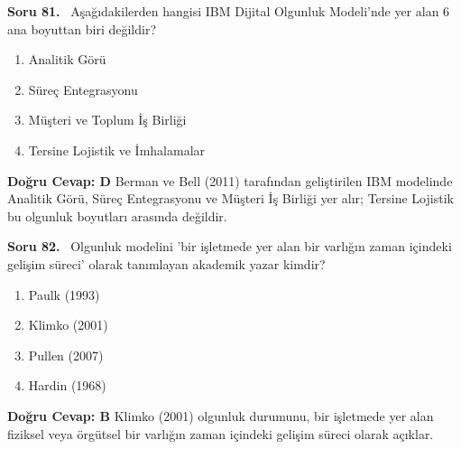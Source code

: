 \documentclass[11pt,a4paper,openany]{book}
\begin{document}
\needspace{5cm}
\vspace{8pt}
\noindent\textbf{\large\sffamily Soru 81.} \ Aşağıdakilerden hangisi IBM Dijital Olgunluk Modeli'nde yer alan 6 ana boyuttan biri değildir?
\begin{enumerate}[label=\Alph*), leftmargin=25pt, topsep=4pt, itemsep=2pt]
    \item Analitik Görü
    \item Süreç Entegrasyonu
    \item Müşteri ve Toplum İş Birliği
    \item Tersine Lojistik ve İmhalamalar
\end{enumerate}
\vspace{4pt}
\begin{tcolorbox}[title=Cevap ve Açıklama, colback=gray!3!white, colframe=primarycolor!90!black, arc=2mm, fonttitle=\bfseries\sffamily, top=6pt, bottom=6pt]
    \textbf{Doğru Cevap: D}
    \vspace{2pt}
    Berman ve Bell (2011) tarafından geliştirilen IBM modelinde Analitik Görü, Süreç Entegrasyonu ve Müşteri İş Birliği yer alır; Tersine Lojistik bu olgunluk boyutları arasında değildir.
\end{tcolorbox}
\vspace{10pt}

\needspace{5cm}
\vspace{8pt}
\noindent\textbf{\large\sffamily Soru 82.} \ Olgunluk modelini 'bir işletmede yer alan bir varlığın zaman içindeki gelişim süreci' olarak tanımlayan akademik yazar kimdir?
\begin{enumerate}[label=\Alph*), leftmargin=25pt, topsep=4pt, itemsep=2pt]
    \item Paulk (1993)
    \item Klimko (2001)
    \item Pullen (2007)
    \item Hardin (1968)
\end{enumerate}
\vspace{4pt}
\begin{tcolorbox}[title=Cevap ve Açıklama, colback=gray!3!white, colframe=primarycolor!90!black, arc=2mm, fonttitle=\bfseries\sffamily, top=6pt, bottom=6pt]
    \textbf{Doğru Cevap: B}
    \vspace{2pt}
    Klimko (2001) olgunluk durumunu, bir işletmede yer alan fiziksel veya örgütsel bir varlığın zaman içindeki gelişim süreci olarak açıklar.
\end{tcolorbox}
\vspace{10pt}
\end{document}
